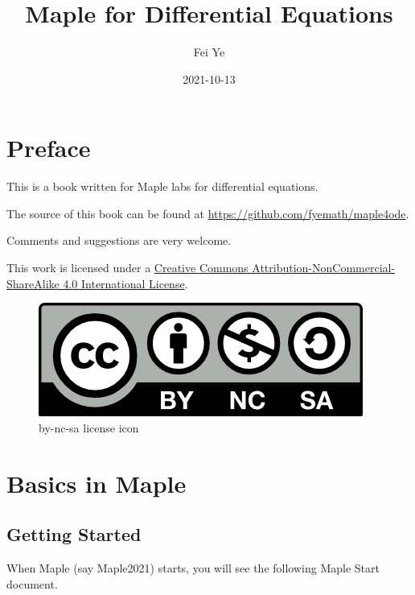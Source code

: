 \documentclass[
  12pt]{elegantbook}
\institute{QCC-CUNY}
\title{Maple for Differential Equations}
\author{Fei Ye}
\date{2021-10-13}
\begin{document}
\maketitle

{
\setcounter{tocdepth}{0}
\tableofcontents
}
\mainmatter

\hypersetup{pageanchor=true}

\captionsetup[figure]{labelformat=empty}
\captionsetup[subfigure]{labelformat=empty}

\hypertarget{preface}{%
\chapter*{Preface}\label{preface}}

This is a book written for Maple labs for differential equations.

The source of this book can be found at \url{https://github.com/fyemath/maple4ode}.

Comments and suggestions are very welcome.

This work is licensed under a \href{https://creativecommons.org/licenses/by-nc-sa/4.0/}{Creative Commons Attribution-NonCommercial-ShareAlike 4.0 International License}.

\begin{figure}
\centering
\includegraphics{figs/by-nc-sa.png}
\caption{by-nc-sa license icon}
\end{figure}

\hypertarget{basics-in-maple}{%
\chapter{Basics in Maple}\label{basics-in-maple}}

\hypertarget{getting-started}{%
\section{Getting Started}\label{getting-started}}

When Maple (say Maple2021) starts, you will see the following Maple Start document.
\end{document}
